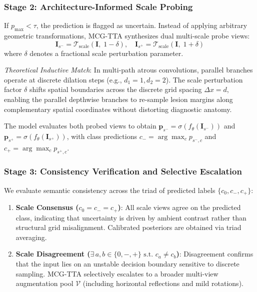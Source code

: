 \subsubsection{Stage 2: Architecture-Informed Scale Probing}
If $p_{\max} < \tau$, the prediction is flagged as uncertain. Instead of applying arbitrary geometric transformations, MCG-TTA synthesizes dual multi-scale probe views:
\begin{equation}
\mathbf{I}_{s^-} = \mathcal{T}_{\text{scale}}(\mathbf{I}, \; 1 - \delta), \quad \mathbf{I}_{s^+} = \mathcal{T}_{\text{scale}}(\mathbf{I}, \; 1 + \delta)
\label{eq:scale_probes}
\end{equation}
where $\delta$ denotes a fractional scale perturbation parameter.

\emph{Theoretical Inductive Match}: In multi-path atrous convolutions, parallel branches operate at discrete dilation steps (e.g., $d_1 = 1, d_2 = 2$). The scale perturbation factor $\delta$ shifts spatial boundaries across the discrete grid spacing $\Delta x = d$, enabling the parallel depthwise branches to re-sample lesion margins along complementary spatial coordinates without distorting diagnostic anatomy.

The model evaluates both probed views to obtain $\mathbf{p}_{s^-} = \sigma(f_\theta(\mathbf{I}_{s^-}))$ and $\mathbf{p}_{s^+} = \sigma(f_\theta(\mathbf{I}_{s^+}))$, with class predictions $c_- = \arg\max_c p_{s^-, c}$ and $c_+ = \arg\max_c p_{s^+, c}$.

\subsubsection{Stage 3: Consistency Verification and Selective Escalation}
We evaluate semantic consistency across the triad of predicted labels $\{c_0, c_-, c_+\}$:
\begin{enumerate}
\item \textbf{Scale Consensus ($c_0 = c_- = c_+$)}: All scale views agree on the predicted class, indicating that uncertainty is driven by ambient contrast rather than structural grid misalignment. Calibrated posteriors are obtained via triad averaging.
\item \textbf{Scale Disagreement ($\exists \, a, b \in \{0, -, +\} \text{ s.t. } c_a \ne c_b$)}: Disagreement confirms that the input lies on an unstable decision boundary sensitive to discrete sampling. MCG-TTA selectively escalates to a broader multi-view augmentation pool $\mathcal{V}$ (including horizontal reflections and mild rotations).
\end{enumerate}

